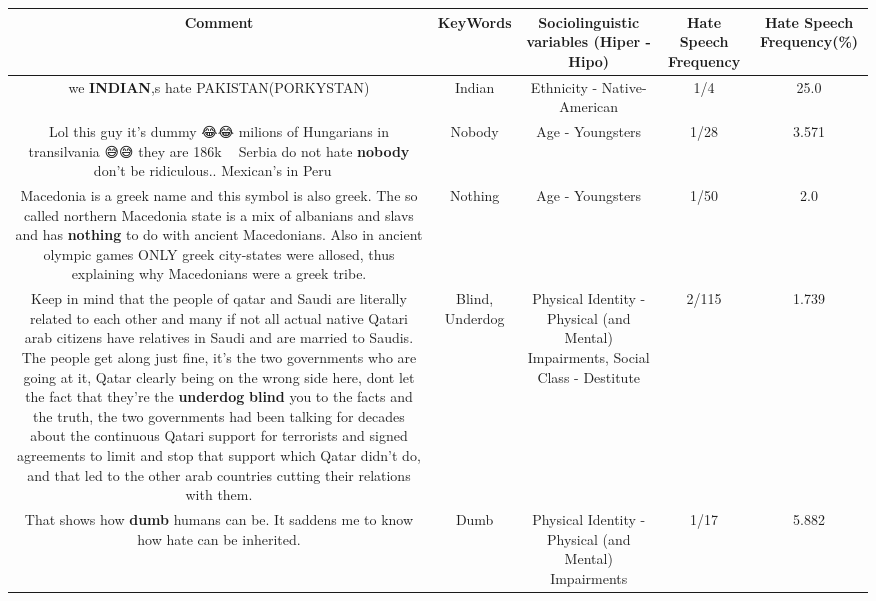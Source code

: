 \documentclass[11pt]{article}
\newlength\mylength
\begin{document}
\begin{center}
\setlength\mylength{\dimexpr\textwidth - 1\arrayrulewidth - 50\tabcolsep}
\begin{longtable}{|C{.65\mylength}|C{.30\mylength}|C{.12\mylength}|C{.12\mylength}|C{.12\mylength}|}
\hline
\textbf{Comment} & \textbf{KeyWords} & \textbf{Sociolinguistic variables (Hiper - Hipo)}  & \textbf{Hate Speech Frequency} & \textbf{Hate Speech Frequency(\%)} \\
\hline{}\small we \textbf{INDIAN},s hate PAKISTAN(PORKYSTAN)\normalsize   & Indian & Ethnicity - Native-American & 1/4 & 25.0 \\  \hline
  \small Lol this guy it's dummy 😂😂 milions of Hungarians in transilvania 😅😅 they are 186k 🤣🤣 Serbia do not hate \textbf{nobody} don't be ridiculous.. Mexican's in Peru 🥴🥴\normalsize   & Nobody & Age - Youngsters & 1/28 & 3.571 \\  \hline
  \small Macedonia is a greek name and this symbol is also greek. The so called northern Macedonia state is a mix of albanians and slavs and has \textbf{nothing} to do with ancient Macedonians. Also in ancient olympic games ONLY greek city-states were allosed, thus explaining why Macedonians were a greek tribe.\normalsize   & Nothing & Age - Youngsters & 1/50 & 2.0 \\  \hline
  \small Keep in mind that the people of qatar and Saudi are literally related to each other and many if not all actual native Qatari arab citizens have relatives in Saudi and are married to Saudis. The people get along just fine, it's the two governments who are going at it, Qatar clearly being on the wrong side here, dont let the fact that they're the \textbf{underdog} \textbf{blind} you to the facts and the truth, the two governments had been talking for decades about the continuous Qatari support for terrorists  and signed agreements to limit and stop that support which Qatar didn't do, and that led to the other arab countries cutting their relations with them.\normalsize   & Blind, Underdog & Physical Identity - Physical (and Mental) Impairments, Social Class - Destitute & 2/115 & 1.739 \\  \hline
  \small That shows how \textbf{dumb} humans can be. It saddens me to know how hate can be inherited.\normalsize   & Dumb & Physical Identity - Physical (and Mental) Impairments & 1/17 & 5.882 \\  \hline

\end{longtable}
\end{center}
\end{document}
